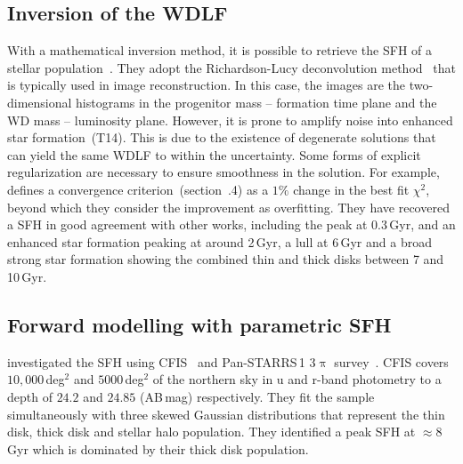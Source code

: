 \documentclass[fleqn,usenatbib]{mnras}
\begin{document}
\subsection{Inversion of the WDLF}
\label{sec:inversion}
With a mathematical inversion method, it is possible to retrieve the SFH of a
stellar population~\citep{2013MNRAS.434.1549R}. They adopt the Richardson-Lucy 
deconvolution method~\citep{1972JOSA...62...55R, 1974AJ.....79..745L} that is 
typically used in image reconstruction. In this case, the images are the
two-dimensional histograms in the progenitor mass -- formation time plane and
the WD mass -- luminosity plane. However, it is prone to amplify noise into
enhanced star formation~(T14). This is due to the existence of degenerate
solutions that can yield the same WDLF to within the uncertainty. Some forms
of explicit regularization are necessary to ensure smoothness in the solution.
For example, \citet{2013MNRAS.434.1549R} defines a convergence
criterion~(section~.4) as a $1\%$ change in the best fit
$\chi^2$, beyond which they consider the improvement as overfitting. They have 
recovered a SFH in good agreement with other works, including the peak at
0.3\,Gyr, and an enhanced star formation peaking at around 2\,Gyr, a lull at
6\,Gyr and a broad strong star formation showing the combined thin and thick
disks between 7 and 10\,Gyr.

\subsection{Forward modelling with parametric SFH}
\citet{2019ApJ...887..148F} investigated the SFH using
CFIS~\citep{2017ApJ...848..128I} and Pan-STARRS\,1 3$\uppi$
survey~\citep{2016arXiv161205560C}. CFIS covers $10,000$\,deg$^2$ and
$5000$\,deg$^2$ of the northern sky in u and r-band photometry to a depth of
$24.2$ and $24.85$ (AB\,mag) respectively. They fit the sample simultaneously
with three skewed Gaussian distributions that represent the thin disk, thick
disk and stellar halo population. They identified a peak SFH at $\approx8$\,Gyr
which is dominated by their thick disk population.

\end{document}
